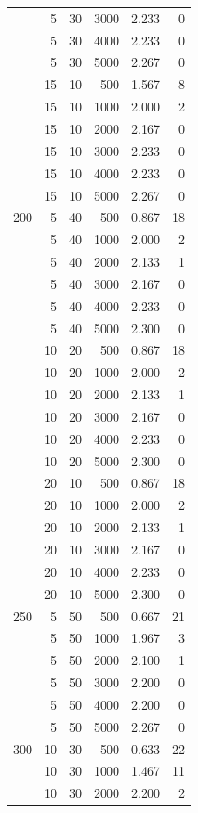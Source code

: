 \begin{longtable}{rrrrrr}
 & 5 & 30 & 3000 & 2.233 & 0 \\
 & 5 & 30 & 4000 & 2.233 & 0 \\
 & 5 & 30 & 5000 & 2.267 & 0 \\
 & 15 & 10 & 500 & 1.567 & 8 \\
 & 15 & 10 & 1000 & 2.000 & 2 \\
 & 15 & 10 & 2000 & 2.167 & 0 \\
 & 15 & 10 & 3000 & 2.233 & 0 \\
 & 15 & 10 & 4000 & 2.233 & 0 \\
 & 15 & 10 & 5000 & 2.267 & 0 \\
\midrule
200 & 5 & 40 & 500 & 0.867 & 18 \\
 & 5 & 40 & 1000 & 2.000 & 2 \\
 & 5 & 40 & 2000 & 2.133 & 1 \\
 & 5 & 40 & 3000 & 2.167 & 0 \\
 & 5 & 40 & 4000 & 2.233 & 0 \\
 & 5 & 40 & 5000 & 2.300 & 0 \\
 & 10 & 20 & 500 & 0.867 & 18 \\
 & 10 & 20 & 1000 & 2.000 & 2 \\
 & 10 & 20 & 2000 & 2.133 & 1 \\
 & 10 & 20 & 3000 & 2.167 & 0 \\
 & 10 & 20 & 4000 & 2.233 & 0 \\
 & 10 & 20 & 5000 & 2.300 & 0 \\
 & 20 & 10 & 500 & 0.867 & 18 \\
 & 20 & 10 & 1000 & 2.000 & 2 \\
 & 20 & 10 & 2000 & 2.133 & 1 \\
 & 20 & 10 & 3000 & 2.167 & 0 \\
 & 20 & 10 & 4000 & 2.233 & 0 \\
 & 20 & 10 & 5000 & 2.300 & 0 \\
\midrule
250 & 5 & 50 & 500 & 0.667 & 21 \\
 & 5 & 50 & 1000 & 1.967 & 3 \\
 & 5 & 50 & 2000 & 2.100 & 1 \\
 & 5 & 50 & 3000 & 2.200 & 0 \\
 & 5 & 50 & 4000 & 2.200 & 0 \\
 & 5 & 50 & 5000 & 2.267 & 0 \\
\midrule
300 & 10 & 30 & 500 & 0.633 & 22 \\
 & 10 & 30 & 1000 & 1.467 & 11 \\
 & 10 & 30 & 2000 & 2.200 & 2 \\

\end{longtable}
